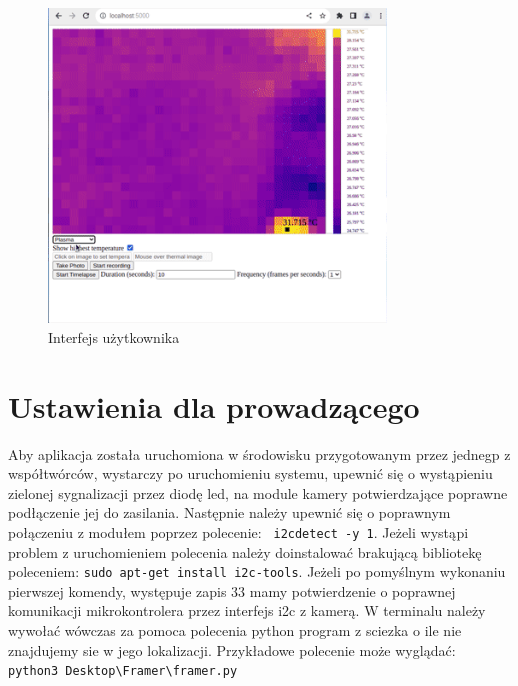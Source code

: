 \documentclass[a4paper,twoside,12pt]{book}
\begin{document}
\begin{figure}[h]
  \centering
  \includegraphics[width=0.8\textwidth]{frame_014_delay-0.1s.png}
  \caption{Interfejs użytkownika}
  \label{fig:obrazek}
\end{figure}









\chapter{Ustawienia dla prowadzącego}
\label{ch:Ustawienia-dla-prowadzacego}
Aby aplikacja została uruchomiona w środowisku przygotowanym przez jednegp z współtwórców, wystarczy po uruchomieniu systemu, upewnić się o wystąpieniu zielonej sygnalizacji przez diodę led, na module kamery potwierdzające poprawne podłączenie jej do zasilania. Następnie należy upewnić się o poprawnym połączeniu z modułem poprzez polecenie: \lstinline| i2cdetect -y 1|. Jeżeli wystąpi problem z uruchomieniem polecenia należy doinstalować brakującą bibliotekę poleceniem: \lstinline|sudo apt-get install i2c-tools|. Jeżeli po pomyślnym wykonaniu pierwszej komendy, występuje zapis 33 mamy potwierdzenie o poprawnej komunikacji mikrokontrolera przez interfejs i2c z kamerą. W terminalu należy wywołać wówczas za pomoca polecenia python program z sciezka o ile nie znajdujemy sie w jego lokalizacji. Przykładowe polecenie może wyglądać: \lstinline| python3 Desktop\Framer\framer.py|
\end{document}
